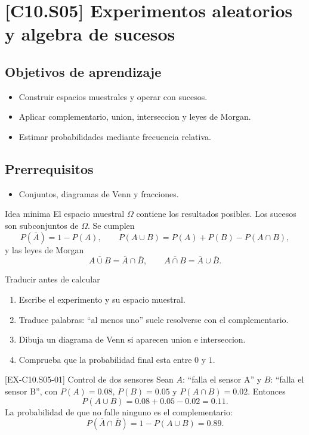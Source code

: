 \section{[C10.S05] Experimentos aleatorios y algebra de sucesos}

\subsection*{Objetivos de aprendizaje}
\begin{itemize}
  \item Construir espacios muestrales y operar con sucesos.
  \item Aplicar complementario, union, interseccion y leyes de Morgan.
  \item Estimar probabilidades mediante frecuencia relativa.
\end{itemize}

\subsection*{Prerrequisitos}
\begin{itemize}
  \item Conjuntos, diagramas de Venn y fracciones.
\end{itemize}

\begin{theorybox}{Idea minima}
El espacio muestral \(\Omega\) contiene los resultados posibles. Los sucesos son subconjuntos de
\(\Omega\). Se cumplen
\[
P(\overline A)=1-P(A),\qquad
P(A\cup B)=P(A)+P(B)-P(A\cap B),
\]
y las leyes de Morgan
\[
\overline{A\cup B}=\overline A\cap\overline B,
\qquad
\overline{A\cap B}=\overline A\cup\overline B.
\]
\end{theorybox}

\begin{methodbox}{Traducir antes de calcular}
\begin{enumerate}
  \item Escribe el experimento y su espacio muestral.
  \item Traduce palabras: ``al menos uno'' suele resolverse con el complementario.
  \item Dibuja un diagrama de Venn si aparecen union e interseccion.
  \item Comprueba que la probabilidad final esta entre \(0\) y \(1\).
\end{enumerate}
\end{methodbox}

\begin{solvedexample}{[EX-C10.S05-01] Control de dos sensores}
Sean \(A\): ``falla el sensor A'' y \(B\): ``falla el sensor B'', con
\(P(A)=0.08\), \(P(B)=0.05\) y \(P(A\cap B)=0.02\). Entonces
\[
P(A\cup B)=0.08+0.05-0.02=0.11.
\]
La probabilidad de que no falle ninguno es el complementario:
\[
P(\overline A\cap\overline B)=1-P(A\cup B)=0.89.
\]
\end{solvedexample}


